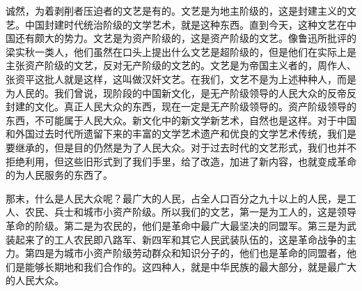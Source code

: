 诚然，为着剥削者压迫者的文艺是有的。文艺是为地主阶级的，这是封建主义的文艺。中国封建时代统治阶级的文学艺术，就是这种东西。直到今天，这种文艺在中国还有颇大的势力。文艺是为资产阶级的，这是资产阶级的文艺。像鲁迅所批评的梁实秋一类人，他们虽然在口头上提出什么文艺是超阶级的，但是他们在实际上是主张资产阶级的文艺，反对无产阶级的文艺的。文艺是为帝国主义者的，周作人、张资平这批人就是这样，这叫做汉奸文艺。在我们，文艺不是为上述种种人，而是为人民的。我们曾说，现阶段的中国新文化，是无产阶级领导的人民大众的反帝反封建的文化。真正人民大众的东西，现在一定是无产阶级领导的。资产阶级领导的东西，不可能属于人民大众。新文化中的新文学新艺术，自然也是这样。对于中国和外国过去时代所遗留下来的丰富的文学艺术遗产和优良的文学艺术传统，我们是要继承的，但是目的仍然是为了人民大众。对于过去时代的文艺形式，我们也并不拒绝利用，但这些旧形式到了我们手里，给了改造，加进了新内容，也就变成革命的为人民服务的东西了。

那末，什么是人民大众呢？最广大的人民，占全人口百分之九十以上的人民，是工人、农民、兵士和城市小资产阶级。所以我们的文艺，第一是为工人的，这是领导革命的阶级。第二是为农民的，他们是革命中最广大最坚决的同盟军。第三是为武装起来了的工人农民即八路军、新四军和其它人民武装队伍的，这是革命战争的主力。第四是为城市小资产阶级劳动群众和知识分子的，他们也是革命的同盟者，他们是能够长期地和我们合作的。这四种人，就是中华民族的最大部分，就是最广大的人民大众。

